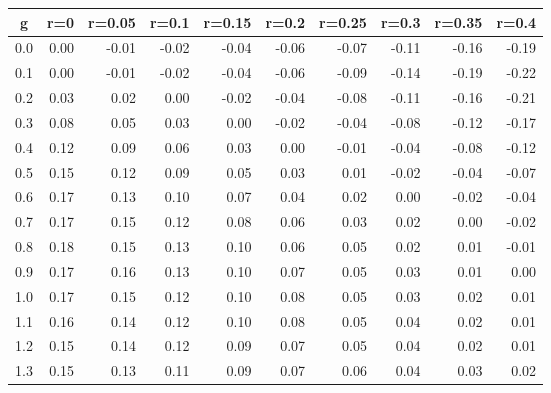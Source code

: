 %
\begin{table}[!tbp]
 \begin{center}
 \begin{tabular}{rrrrrrrrrr}\hline\hline
\multicolumn{1}{c}{g}&\multicolumn{1}{c}{r=0}&\multicolumn{1}{c}{r=0.05}&\multicolumn{1}{c}{r=0.1}&\multicolumn{1}{c}{r=0.15}&\multicolumn{1}{c}{r=0.2}&\multicolumn{1}{c}{r=0.25}&\multicolumn{1}{c}{r=0.3}&\multicolumn{1}{c}{r=0.35}&\multicolumn{1}{c}{r=0.4}\tabularnewline
\hline
0.0&0.00&-0.01&-0.02&-0.04&-0.06&-0.07&-0.11&-0.16&-0.19\tabularnewline
0.1&0.00&-0.01&-0.02&-0.04&-0.06&-0.09&-0.14&-0.19&-0.22\tabularnewline
0.2&0.03& 0.02& 0.00&-0.02&-0.04&-0.08&-0.11&-0.16&-0.21\tabularnewline
0.3&0.08& 0.05& 0.03& 0.00&-0.02&-0.04&-0.08&-0.12&-0.17\tabularnewline
0.4&0.12& 0.09& 0.06& 0.03& 0.00&-0.01&-0.04&-0.08&-0.12\tabularnewline
0.5&0.15& 0.12& 0.09& 0.05& 0.03& 0.01&-0.02&-0.04&-0.07\tabularnewline
0.6&0.17& 0.13& 0.10& 0.07& 0.04& 0.02& 0.00&-0.02&-0.04\tabularnewline
0.7&0.17& 0.15& 0.12& 0.08& 0.06& 0.03& 0.02& 0.00&-0.02\tabularnewline
0.8&0.18& 0.15& 0.13& 0.10& 0.06& 0.05& 0.02& 0.01&-0.01\tabularnewline
0.9&0.17& 0.16& 0.13& 0.10& 0.07& 0.05& 0.03& 0.01& 0.00\tabularnewline
1.0&0.17& 0.15& 0.12& 0.10& 0.08& 0.05& 0.03& 0.02& 0.01\tabularnewline
1.1&0.16& 0.14& 0.12& 0.10& 0.08& 0.05& 0.04& 0.02& 0.01\tabularnewline
1.2&0.15& 0.14& 0.12& 0.09& 0.07& 0.05& 0.04& 0.02& 0.01\tabularnewline
1.3&0.15& 0.13& 0.11& 0.09& 0.07& 0.06& 0.04& 0.03& 0.02\tabularnewline
\hline
\end{tabular}

\end{center}

\end{table}

